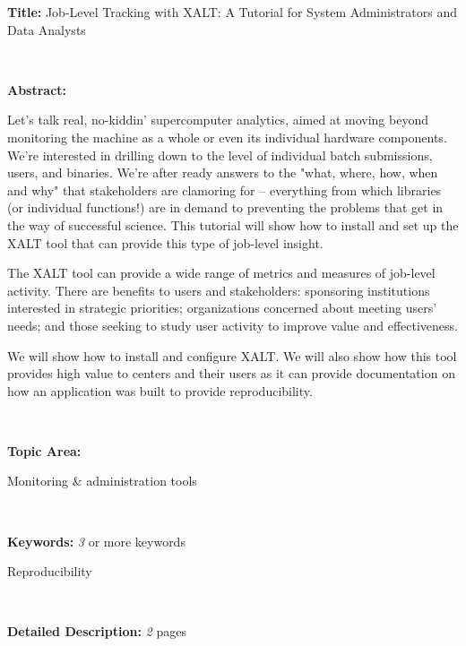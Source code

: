 \documentclass[12pt]{article}
\begin{document}
\noindent
{\bf{}Title:} Job-Level Tracking with XALT: A Tutorial for System Administrators and Data Analysts

~~


\noindent
{\bf{}Abstract:}



Let’s talk real, no-kiddin’ supercomputer analytics, aimed at moving
beyond monitoring the machine as a whole or even its individual
hardware components. We’re interested in drilling down to the level of
individual batch submissions, users, and binaries. We’re after ready
answers to the "what, where, how, when and why" that stakeholders are
clamoring for – everything from which libraries (or individual
functions!) are in demand to preventing the problems that get in the
way of successful science. This tutorial will show how to install and
set up the XALT tool that can provide this type of job-level insight.
 
The XALT tool can provide a wide range of metrics and measures of
job-level activity. There are benefits to users and stakeholders:
sponsoring institutions interested in strategic priorities;
organizations concerned about meeting users’ needs; and those seeking
to study user activity to improve value and effectiveness.
 
We will show how to install and configure XALT. We will also show how
this tool provides high value to centers and their users as it can
provide documentation on how an application was built to provide
reproducibility. 

~~

\noindent
{\bf{}Topic Area:}

Monitoring \& administration tools

~~

\noindent
{\bf{}Keywords:} {\emph 3 or more  keywords}

Reproducibility

~~

\noindent
{\bf{}Detailed Description:} {\emph 2 pages}

\end{document}
